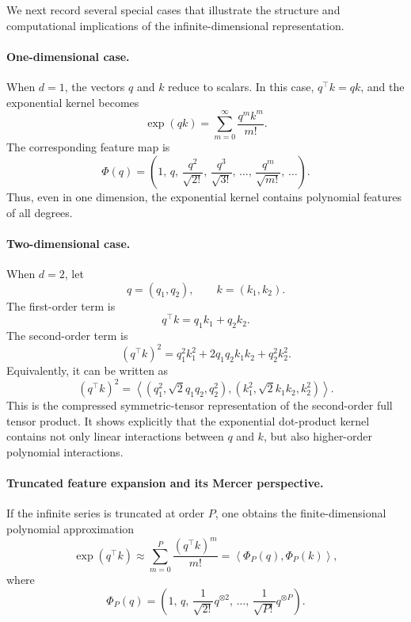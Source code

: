 \documentclass{article}
\begin{document}
We next record several special cases that illustrate the structure and computational implications of the infinite-dimensional representation.

\paragraph{One-dimensional case.}
When $d=1$, the vectors $q$ and $k$ reduce to scalars. In this case, $q^\top k=qk$, and the exponential kernel becomes
\begin{equation}
    \exp(qk)
    =
    \sum_{m=0}^{\infty}
    \frac{q^m k^m}{m!}.
\end{equation}
The corresponding feature map is
\begin{equation}
    \Phi(q)
    =
    \left(
    1,\,
    q,\,
    \frac{q^2}{\sqrt{2!}},\,
    \frac{q^3}{\sqrt{3!}},\,
    \ldots,\,
    \frac{q^m}{\sqrt{m!}},\,
    \ldots
    \right).
\end{equation}
Thus, even in one dimension, the exponential kernel contains polynomial features of all degrees.

\paragraph{Two-dimensional case.}
When $d=2$, let
\begin{equation}
    q=(q_1,q_2),
    \qquad
    k=(k_1,k_2).
\end{equation}
The first-order term is
\begin{equation}
    q^\top k=q_1k_1+q_2k_2.
\end{equation}
The second-order term is
\begin{equation}
    (q^\top k)^2
    =
    q_1^2k_1^2
    +
    2q_1q_2k_1k_2
    +
    q_2^2k_2^2.
\end{equation}
Equivalently, it can be written as
\begin{equation}
    (q^\top k)^2
    =
    \left\langle
    \left(q_1^2,\sqrt{2}q_1q_2,q_2^2\right),
    \left(k_1^2,\sqrt{2}k_1k_2,k_2^2\right)
    \right\rangle .
\end{equation}
This is the compressed symmetric-tensor representation of the second-order full tensor product. 
It shows explicitly that the exponential dot-product kernel contains not only linear interactions between $q$ and $k$, but also higher-order polynomial interactions.

\paragraph{Truncated feature expansion and its Mercer perspective.}
If the infinite series is truncated at order $P$, one obtains the finite-dimensional polynomial approximation
\begin{equation}
    \exp(q^\top k)
    \approx
    \sum_{m=0}^{P}
    \frac{(q^\top k)^m}{m!}
    =
    \left\langle
    \Phi_P(q),
    \Phi_P(k)
    \right\rangle,
\end{equation}
where
\begin{equation}
    \Phi_P(q)
    =
    \left(
    1,\,
    q,\,
    \frac{1}{\sqrt{2!}}q^{\otimes 2},\,
    \ldots,\,
    \frac{1}{\sqrt{P!}}q^{\otimes P}
    \right).
\end{equation}
\end{document}
